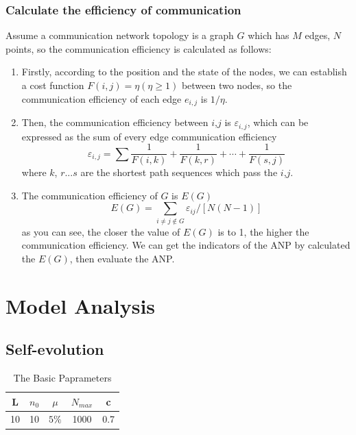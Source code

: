 \documentclass{article}
\begin{document}
\subsubsection{Calculate the efficiency of communication}
Assume a communication network topology is a graph $G$ which has $M$ edges, $N$ points, so the communication 
efficiency is calculated as follows:
\begin{enumerate}
    \item Firstly, according to the position and the state of the nodes, we can establish a cost function 
    \(F(i,j)=\eta (\eta \ge1)\)
    between two nodes, so the communication efficiency of each edge \(e_{i,j}\) is \(1/\eta\).
    \item Then, the communication efficiency between $i$,$j$ is \(\varepsilon_{i,j}\), which can be expressed 
    as the sum of every edge communication efficiency
    \begin{displaymath}
    \varepsilon_{i,j}=\sum\frac{1}{F(i,k)}+\frac{1}{F(k,r)}+\cdots+\frac{1}{F(s,j)}
    \end{displaymath}
    where $k$, $r$...$s$ are the shortest path sequences which pass the $i$,$j$.
    \item The communication efficiency of $G$ is $E(G)$
    \begin{displaymath}
    E(G)=\sum_{i\ne j\notin G}\varepsilon_{ij}/[N(N-1)]
    \end{displaymath}
    as you can see, the closer the value of $E(G)$ is to 1, the higher the communication efficiency.
    We can get the indicators of the ANP by calculated the $E(G)$, then evaluate the ANP.
\end{enumerate}

\section{Model Analysis}
\subsection{Self-evolution}
\renewcommand\arraystretch{1.2}
\begin{table}%
  \centering
  \caption{The Basic Paprameters}\label{tab:tab1}
  \begin{tabular}{ccccc}
  \hline
  L & $n_0$ & $\mu$ & $N_{max}$ & c \\
  \hline
  10 & 10 & $5\%$ & 1000 & 0.7 \\
  \hline
\end{tabular}

\end{table}
\end{document}
